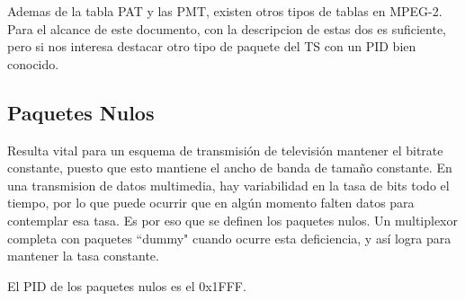 	Ademas de la tabla PAT y las PMT, existen otros tipos de tablas en MPEG-2. Para el alcance de este documento, con la descripcion de estas dos es suficiente, pero si nos interesa destacar otro tipo de paquete del TS con un PID bien conocido.
	
	\subsection{Paquetes Nulos}
	
	Resulta vital para un esquema de transmisión de televisión mantener el bitrate constante, puesto que esto mantiene el ancho de banda de tamaño constante. En una transmision de datos multimedia, hay variabilidad en la tasa de bits todo el tiempo, por lo que puede ocurrir que en algún momento falten datos para contemplar esa tasa. Es por eso que se definen los paquetes nulos. Un multiplexor completa con paquetes ``dummy" cuando ocurre esta deficiencia, y así logra para mantener la tasa constante.
	
	El PID de los paquetes nulos es el 0x1FFF.

